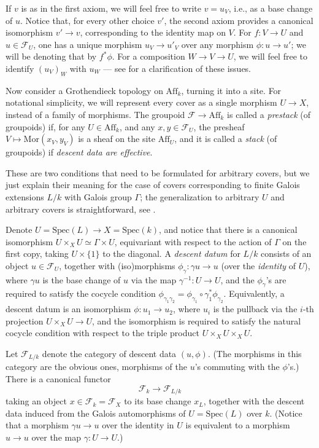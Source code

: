 If $v$ is as in the first axiom, we will feel free to write $v=u_V$, i.e., as a base change of $u$. Notice that, for every other choice $v'$, the second axiom provides a canonical isomorphism $v'\to v$, corresponding to the identity map on $V$. For $f: V\to U$ and $u\in \mathcal F_U$, one has a unique morphism $u_V\to u'_V$ over any morphism $\phi: u\to u'$; we will be denoting that by $f^*\phi$. For a composition $W\to V\to U$, we will feel free to identify $(u_V)_W$ with $u_W$ --- see \cite[Tag 02XN]{stacks-project} for a clarification of these issues. 

Now consider a Grothendieck topology on $\text{Aff}_k$, turning it into a site. For notational simplicity, we will represent every cover as a single morphism $U\to X$, instead of a family of morphisms. The groupoid $\mathcal F \to \text{Aff}_k$ is called a \emph{prestack} (of groupoids) if, for any $U\in \text{Aff}_k$, and any $x,y \in \mathcal F_U$, the presheaf $V\mapsto \text{Mor}(x_V,y_V)$ is a sheaf on the site $\text{Aff}_U$, and it is called a \emph{stack} (of groupoids) if \emph{descent data are effective}. 

These are two conditions that need to be formulated for arbitrary covers, but we just explain their meaning for the case of covers corresponding to finite Galois extensions $L/k$ with Galois group $\Gamma$; the generalization to arbitrary $U$ and arbitrary covers is straightforward, see \cite[Tag 0268]{stacks-project}. 

Denote $U=\text{Spec}(L) \to X=\text{Spec}(k)$, and notice that there is a canonical isomorphism $U\times_X U \simeq \Gamma\times  U$, equivariant with respect to the action of $\Gamma$ on the first copy, taking $U\times \{1\}$ to the diagonal. A \emph{descent datum} for $L/k$ consists of an object $u\in \mathcal F_U$, together with (iso)morphisms $\phi_\gamma: \gamma u \to u$ (over the \emph{identity} of $U$), where $\gamma u$ is the base change of $u$ via the map $\gamma^{-1}: U\to U$, and the $\phi_\gamma$'s are required to satisfy the cocycle condition $\phi_{\gamma_1 \gamma_2} = \phi_{\gamma_1} \circ \gamma_1^* \phi_{\gamma_2}$. Equivalently, a descent datum is an isomorphism $\phi: u_1 \to u_2$, where $u_i$ is the pullback via the $i$-th projection $U\times_X U\to U$, and the isomorphism is required to satisfy the natural cocycle condition with respect to the triple product $U\times_X U\times_X U$.

Let $\mathcal F_{L/k}$ denote the category of descent data $(u, \phi)$. (The morphisms in this category are the obvious ones, morphisms of the $u$'s commuting with the $\phi$'s.) There is a canonical functor 
\begin{equation}
\label{equation-descent} 
\mathcal F_k \to \mathcal F_{L/k} 
\end{equation}
taking an object $x\in \mathcal F_k = \mathcal F_X$ to its base change $x_L$, together with the descent data induced from the Galois automorphisms of $U=\text{Spec}(L)$ over $k$. (Notice that a morphism $\gamma u \to u$ over the identity in $U$ is equivalent to a morphism $u\to u$ over the map $\gamma: U\to U$.)

